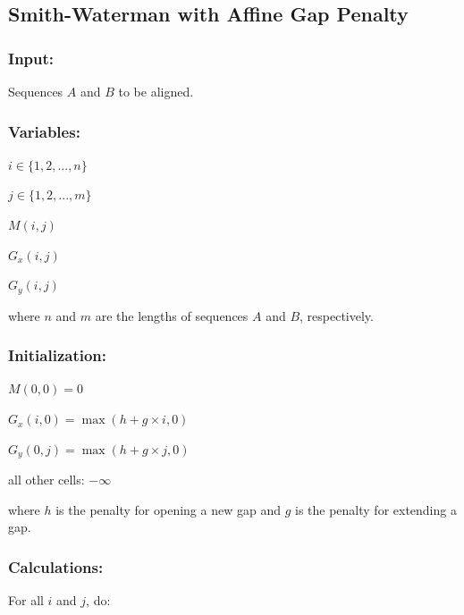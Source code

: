 \documentclass{article}
\begin{document}
\subsection*{Smith-Waterman with Affine Gap Penalty}
\subsubsection*{Input:}
Sequences $A$ and $B$ to be aligned.

\subsubsection*{Variables:}
\indent\indent
$i \in \{1, 2, ..., n\}$

$j \in \{1, 2, ..., m\}$

$M(i,j)$

$G_{x}(i,j)$

$G_{y}(i,j)$

where $n$ and $m$ are the lengths of sequences $A$ and $B$, respectively.

\subsubsection*{Initialization:}
\indent\indent
$M(0,0) = 0$

$G_{x}(i,0) = \max(h + g \times i, 0)$

$G_{y}(0,j) = \max(h + g \times j, 0)$

all other cells: $-\infty$

where $h$ is the penalty for opening a new gap and $g$ is the penalty for extending a gap.

\subsubsection*{Calculations:}

For all $i$ and $j$, do:
\end{document}
